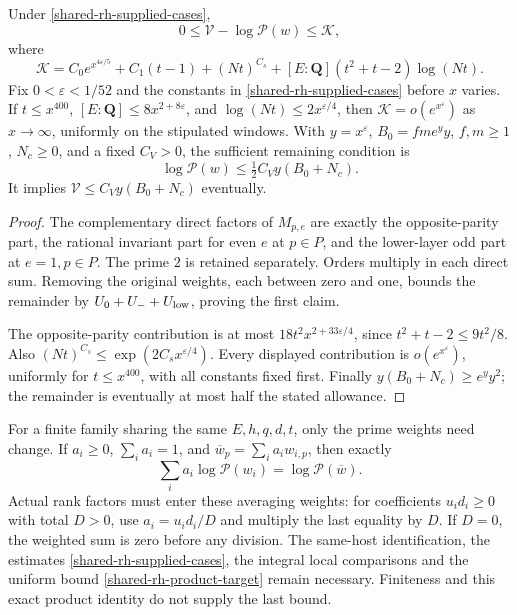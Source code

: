 \begin{proposition}\label{shared-rh-residual-budget}
Under \eqref{shared-rh-supplied-cases},
\[
 0\le\mathcal V-\log\mathcal P(w)\le\mathcal K,
\]
where
\[
 \mathcal K=C_0e^{x^{4\varepsilon/5}}+C_1(t-1)
       +(Nt)^{C_s}+[E:\mathbf Q](t^2+t-2)\log(Nt).
\]
Fix \(0<\varepsilon<1/52\) and the constants in
\eqref{shared-rh-supplied-cases} before \(x\) varies. If
\(t\le x^{400}\), \([E:\mathbf Q]\le8x^{2+8\varepsilon}\), and
\(\log(Nt)\le2x^{\varepsilon/4}\), then
\(\mathcal K=o(e^{x^\varepsilon})\) as \(x\to\infty\), uniformly
on the stipulated windows. With \(y=x^\varepsilon\), \(B_0=fm e^y y\),
\(f,m\ge1\), \(N_c\ge0\), and a fixed \(C_V>0\), the sufficient
remaining condition is
\begin{equation}\label{shared-rh-product-target}
 \log\mathcal P(w)\le\tfrac12 C_V y(B_0+N_c).
\end{equation}
It implies \(\mathcal V\le C_Vy(B_0+N_c)\) eventually.
\end{proposition}
\begin{proof}
The complementary direct factors of \(M_{p,e}\) are exactly the
opposite-parity part, the rational invariant part for even \(e\) at
\(p\in P\), and the lower-layer odd part at \(e=1,p\in P\).
The prime \(2\) is retained separately. Orders multiply in each direct
sum. Removing the original weights, each between zero and one, bounds
the remainder by \(U_0+U_-+U_{\rm low}\), proving the first claim.

The opposite-parity contribution is at most
\(18t^2x^{2+33\varepsilon/4}\), since
\(t^2+t-2\le9t^2/8\). Also
\((Nt)^{C_s}\le\exp(2C_sx^{\varepsilon/4})\).
Every displayed contribution is \(o(e^{x^\varepsilon})\), uniformly
for \(t\le x^{400}\), with all constants fixed first.
Finally \(y(B_0+N_c)\ge e^y y^2\); the remainder is eventually
at most half the stated allowance.
\end{proof}

For a finite family sharing the same \(E,h,q,d,t\), only the prime
weights need change. If \(a_i\ge0\), \(\sum_i a_i=1\), and
\(\overline w_p=\sum_i a_iw_{i,p}\), then exactly
\[
 \sum_i a_i\log\mathcal P(w_i)=\log\mathcal P(\overline w).
\]
Actual rank factors must enter these averaging weights: for coefficients
\(u_i d_i\ge0\) with total \(D>0\), use
\(a_i=u_id_i/D\) and multiply the last equality by \(D\).
If \(D=0\), the weighted sum is zero before any division.
The same-host identification, the estimates
\eqref{shared-rh-supplied-cases}, the integral local comparisons and the
uniform bound \eqref{shared-rh-product-target} remain necessary.
Finiteness and this exact product identity do not supply the last bound.
